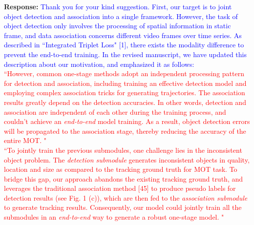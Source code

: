 \documentclass[12pt,journal,onecolumn]{IEEEtran}
\begin{document}
\textbf{Response:}  \textcolor{blue}{Thank you for your kind suggestion.
First, our target is to joint object detection and association into a single framework.
However, the task of object detection only involves the processing of spatial information in static frame, and data association concerns different video frames over time series. 
As described in ``Integrated Triplet Loss" [1], there exists the modality difference to prevent the end-to-end training. 
In the revised manuscript, we have updated this description about our motivation,
and emphasized it as follows:} \\
\textcolor{red}{
``However, common one-stage methods adopt an independent processing pattern for detection and association,
including training an effective detection model and employing complex association tricks for generating trajectories. 
The association results greatly depend on the detection accuracies.
In other words, detection and association are independent of each other during the training process, 
and couldn't achieve an \emph{end-to-end} model training.
As a result, object detection errors will be propagated to the association stage, thereby reducing the accuracy of the entire MOT. "
} \\
\textcolor{red}{
``To jointly train the previous submodules, one challenge lies in the inconsistent object problem.
The \emph{detection submodule} generates inconsistent objects in quality, location and size as compared to the tracking ground truth for MOT task. To bridge this gap, our approach abandons the existing tracking ground truth,
and leverages the traditional association method [45] to produce pseudo labels for detection results (see Fig. 1 (c)), 
which are then fed to the \emph{association submodule} to generate tracking results. 
Consequently, our model could jointly train all the submodules in an \emph{end-to-end} way to generate a robust one-stage model. "
\\
}
%
\end{document}
